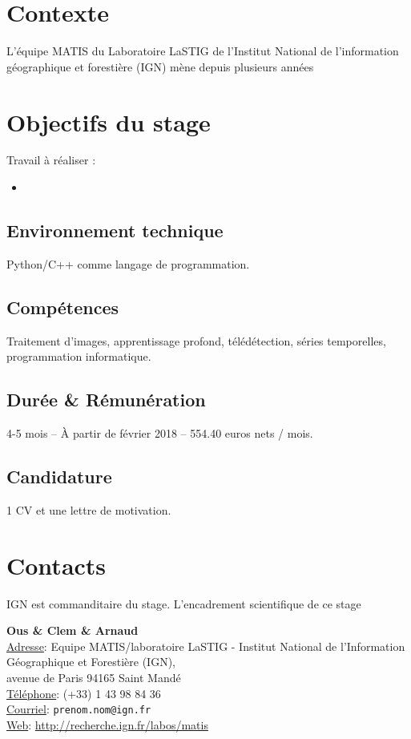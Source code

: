 \documentclass[a4paper,11pt]{article}
\begin{document}
\section*{Contexte}
\noindent
\par
L'équipe MATIS du Laboratoire LaSTIG de l'Institut National de l'information géographique et forestière (IGN) mène depuis plusieurs années

\section*{Objectifs du stage}


Travail à réaliser :
\begin{itemize}
\item
\end{itemize}



\subsection*{Environnement technique}
Python/C++ comme langage de programmation.

\subsection*{Compétences}
Traitement d'images, apprentissage profond, télédétection, séries temporelles, programmation informatique.


\subsection*{Durée \& Rémunération}
4-5 mois -- \`A partir de février 2018 -- 554.40 euros nets / mois.

\subsection*{Candidature}
1 CV et une lettre de motivation.

\section*{Contacts}
IGN est commanditaire du stage. L'encadrement scientifique de ce stage

\noindent
\textbf{Ous \& Clem \& Arnaud}\\
\indent \underline{Adresse}: Equipe MATIS/laboratoire LaSTIG - Institut National de l'Information Géographique et Forestière (IGN),\\
 avenue de Paris 94165 Saint Mandé\\
\indent \underline{Téléphone}: (+33) 1 43 98 84 36\\
\indent \underline{Courriel}: \texttt{prenom.nom@ign.fr}\\
\indent \underline{Web}: \url{http://recherche.ign.fr/labos/matis}\\
\end{document}
